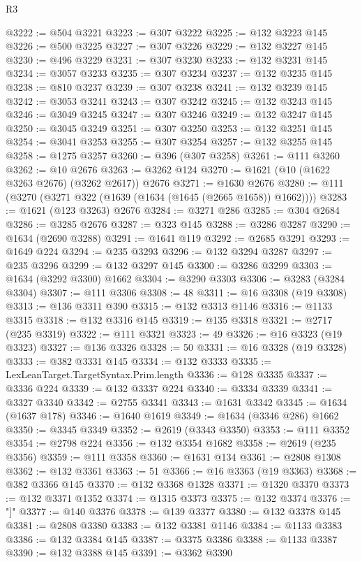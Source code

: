 \begin{lexlean}{R3}
\begin{coremodule}
@3222 := @504 @3221
@3223 := @307 @3222
@3225 := @132 @3223 @145
@3226 := @500 @3225
@3227 := @307 @3226
@3229 := @132 @3227 @145
@3230 := @496 @3229
@3231 := @307 @3230
@3233 := @132 @3231 @145
@3234 := @3057 @3233
@3235 := @307 @3234
@3237 := @132 @3235 @145
@3238 := @810 @3237
@3239 := @307 @3238
@3241 := @132 @3239 @145
@3242 := @3053 @3241
@3243 := @307 @3242
@3245 := @132 @3243 @145
@3246 := @3049 @3245
@3247 := @307 @3246
@3249 := @132 @3247 @145
@3250 := @3045 @3249
@3251 := @307 @3250
@3253 := @132 @3251 @145
@3254 := @3041 @3253
@3255 := @307 @3254
@3257 := @132 @3255 @145
@3258 := @1275 @3257
@3260 := @396 (@307 @3258)
@3261 := @111 @3260
@3262 := @10 @2676
@3263 := @3262 @124
@3270 := @1621 (@10 (@1622 @3263 @2676) (@3262 @2617)) @2676
@3271 := @1630 @2676
@3280 := @111 (@3270 (@3271 @322 (@1639 (@1634 (@1645 (@2665 @1658)) @1662))))
@3283 := @1621 (@123 @3263) @2676
@3284 := @3271 @286
@3285 := @304 @2684
@3286 := @3285 @2676
@3287 := @323 @145
@3288 := @3286 @3287
@3290 := @1634 (@2690 @3288)
@3291 := @1641 @119
@3292 := @2685 @3291
@3293 := @1649 @224
@3294 := @235 @3293
@3296 := @132 @3294 @3287
@3297 := @235 @3296
@3299 := @132 @3297 @145
@3300 := @3286 @3299
@3303 := @1634 (@3292 @3300) @1662
@3304 := @3290 @3303
@3306 := @3283 (@3284 @3304)
@3307 := @111 @3306
@3308 := 48
@3311 := @16 @3308 (@19 @3308)
@3313 := @136 @3311 @390
@3315 := @132 @3313 @1146
@3316 := @1133 @3315
@3318 := @132 @3316 @145
@3319 := @135 @3318
@3321 := @2717 (@235 @3319)
@3322 := @111 @3321
@3323 := 49
@3326 := @16 @3323 (@19 @3323)
@3327 := @136 @3326
@3328 := 50
@3331 := @16 @3328 (@19 @3328)
@3333 := @382 @3331 @145
@3334 := @132 @3333
@3335 := LexLeanTarget.TargetSyntax.Prim.length
@3336 := @128 @3335
@3337 := @3336 @224
@3339 := @132 @3337 @224
@3340 := @3334 @3339
@3341 := @3327 @3340
@3342 := @2755 @3341
@3343 := @1631 @3342
@3345 := @1634 (@1637 @178)
@3346 := @1640 @1619
@3349 := @1634 (@3346 @286) @1662
@3350 := @3345 @3349
@3352 := @2619 (@3343 @3350)
@3353 := @111 @3352
@3354 := @2798 @224
@3356 := @132 @3354 @1682
@3358 := @2619 (@235 @3356)
@3359 := @111 @3358
@3360 := @1631 @134
@3361 := @2808 @1308
@3362 := @132 @3361
@3363 := 51
@3366 := @16 @3363 (@19 @3363)
@3368 := @382 @3366 @145
@3370 := @132 @3368 @1328
@3371 := @1320 @3370
@3373 := @132 @3371 @1352
@3374 := @1315 @3373
@3375 := @132 @3374
@3376 := "]"
@3377 := @140 @3376
@3378 := @139 @3377
@3380 := @132 @3378 @145
@3381 := @2808 @3380
@3383 := @132 @3381 @1146
@3384 := @1133 @3383
@3386 := @132 @3384 @145
@3387 := @3375 @3386
@3388 := @1133 @3387
@3390 := @132 @3388 @145
@3391 := @3362 @3390

\end{coremodule}
\end{lexlean}
